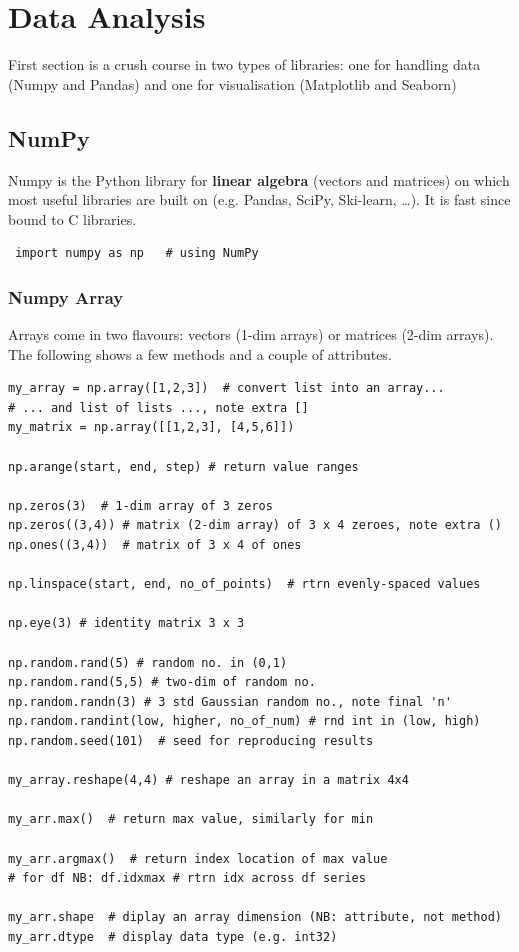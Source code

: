 \documentclass[11pt]{article}
\begin{document}
\section{Data Analysis} \label{sec:Data}
First section is a crush course in two types of libraries: one for handling data (Numpy and Pandas) and one for visualisation (Matplotlib and Seaborn)

\subsection{NumPy}
Numpy is the Python library for \textbf{linear algebra} (vectors and matrices) on which most useful libraries are built on (e.g. Pandas, SciPy,  Ski-learn, \ldots). It is fast since bound to C libraries.

\begin{lstlisting}
 import numpy as np   # using NumPy  
\end{lstlisting}

\subsubsection{Numpy Array}
Arrays come in two flavours: vectors (1-dim arrays) or matrices (2-dim arrays). The following shows a few methods and a couple of attributes.

\begin{lstlisting}
my_array = np.array([1,2,3])  # convert list into an array... 
# ... and list of lists ..., note extra []
my_matrix = np.array([[1,2,3], [4,5,6]])  

np.arange(start, end, step) # return value ranges 

np.zeros(3)  # 1-dim array of 3 zeros
np.zeros((3,4)) # matrix (2-dim array) of 3 x 4 zeroes, note extra ()
np.ones((3,4))  # matrix of 3 x 4 of ones

np.linspace(start, end, no_of_points)  # rtrn evenly-spaced values

np.eye(3) # identity matrix 3 x 3

np.random.rand(5) # random no. in (0,1) 
np.random.rand(5,5) # two-dim of random no.
np.random.randn(3) # 3 std Gaussian random no., note final 'n'
np.random.randint(low, higher, no_of_num) # rnd int in (low, high)
np.random.seed(101)  # seed for reproducing results

my_array.reshape(4,4) # reshape an array in a matrix 4x4

my_arr.max()  # return max value, similarly for min

my_arr.argmax()  # return index location of max value
# for df NB: df.idxmax # rtrn idx across df series

my_arr.shape  # diplay an array dimension (NB: attribute, not method)
my_arr.dtype  # display data type (e.g. int32)
\end{lstlisting}
\end{document}
